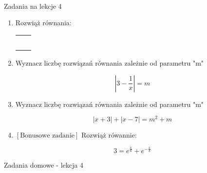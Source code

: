 \documentclass[12pt,a4paper]{article}
\begin{document}
	
	\begin{center}
		\LARGE Zadania na lekcje 4
	\end{center}
	\vspace{1.5cm}
	
	\begin{enumerate}[1.]
		\item Rozwiąż równania:
		
		\begin{enumerate}[a)] \begin{tabular}{p{7cm} p{7cm}} 
				\item $|3x-4|=7$ & \vspace{0.4cm} 	\item$2|x+6|=-4$ \\
				\item $|2x-3|-|3x+3|=x-6$ & \item $2-|x+4|=x^2+3x-2$ \\
				\item $x^2+4x+|x+2|=16$ & \item $x^2+2x+2=2|x+1|$ \\
				\item $(x+1)(|x|-1)=-0,5$ & \item $|x^2+2x+3|=|2x|$ \\
				\item $|x^2-4x+3|=1 $ & \item $x^2-7|x|+10\leq 10 $ \\
		\end{tabular} \end{enumerate}
	
		\item Wyznacz liczbę rozwiązań równania zależnie od parametru "m"
		
		$$|3-\frac{1}{x}|=m$$
		
		\item Wyznacz liczbę rozwiązań równania zależnie od parametru "m"
		
		$$|x+3|+|x-7|=m^2+m $$

		\item $[\text{Bonusowe zadanie}]$ Rozwiąż rówannie:
	
	\Large$$3=e^\frac{x}{8}+e^{-\frac{x}{8}}$$\normalsize

	\end{enumerate}
	
	\newpage
	
	\begin{center}
		\LARGE Zadania domowe - lekcja 4
	\end{center}
	\vspace{1.5cm}
	
\end{document}
